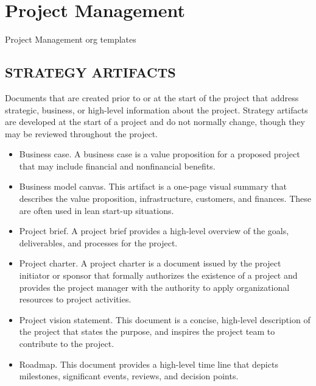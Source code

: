 \documentclass[11pt]{article}
\author{Ricardo Antunes}
\date{\today}
\title{}
\begin{document}
\tableofcontents

\section{Project Management}
\label{sec:org456a8f7}
Project Management org templates

\subsection{STRATEGY ARTIFACTS}
\label{sec:org8fabcd0}
Documents that are created prior to or at the start of the project that address strategic, business, or high-level information about the project. Strategy artifacts are developed at the start of a project and do not normally change, though they may be reviewed throughout the project.
\begin{itemize}
\item Business case. A business case is a value proposition for a proposed project that may include financial and nonfinancial benefits.
\item Business model canvas. This artifact is a one-page visual summary that describes the value proposition, infrastructure, customers, and finances. These are often used in lean start-up situations.
\item Project brief. A project brief provides a high-level overview of the goals, deliverables, and processes for the project.
\item Project charter. A project charter is a document issued by the project initiator or sponsor that formally authorizes the existence of a project and provides the project manager with the authority to apply organizational resources to project activities.
\item Project vision statement. This document is a concise, high-level description of the project that states the purpose, and inspires the project team to contribute to the project.
\item Roadmap. This document provides a high-level time line that depicts milestones, significant events, reviews, and decision points.
\end{itemize}
\end{document}
